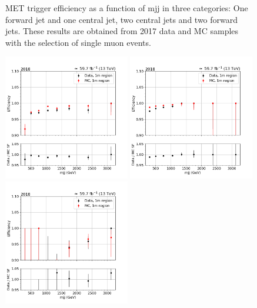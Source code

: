 \begin{figure}[htp]
\begin{center}
    \end{center}
    \caption{MET trigger efficiency as a function of mjj in three categories: One forward jet and one central jet, two central jets and
            two forward jets. These results are obtained from 2017 data and MC samples with the selection of single muon events.} 
    \label{fig:eff_mjj_2017_1m}      
\end{figure}

\begin{figure}[hbp]
    \begin{center}
        \includegraphics[width=0.49\textwidth]{fig/efficiency/trigger/met/mjj/data_mc_comparison_1m_2018_one_jet_forward_one_jet_central.png}
        \includegraphics[width=0.49\textwidth]{fig/efficiency/trigger/met/mjj/data_mc_comparison_1m_2018_two_central_jets.png} \\
        \includegraphics[width=0.49\textwidth]{fig/efficiency/trigger/met/mjj/data_mc_comparison_1m_2018_two_forward_jets.png}

\end{center}
\end{figure}
